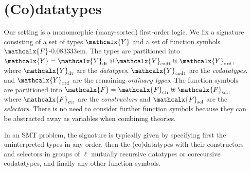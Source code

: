 \documentclass[letter]{article}
\theoremstyle{definition}
\newcommand\Sig{\mathrm{\Sigma}}
\newcommand\ty[1]{\textit{#1}}
\newcommand\Types{\mathcalx{Y}}
\newcommand\Funcs{\mathcalx{F}}
\newcommand\Data{\Types_{\mathrm{dt}}}
\newcommand\Codata{\Types_{\mathrm{codt}}}
\newcommand\Nondata{\Types_{\mathrm{ord}}}
\newcommand\Ctr{\Funcs_{\smash{\mathrm{ctr}}}}
\newcommand\Sel{\Funcs_{\smash{\mathrm{sel}}}}
\newcommand\vthinspace{\kern+0.083333em}
\newcommand\negvthinspace{\kern-0.083333em}
\begin{document}
\section{%
(Co)datatypes}
\label{sec:co-datatypes}

Our setting is a monomorphic (many-sorted) first-order logic.
We fix a signature %
consisting of a set of types $\Types$ and a
set of function symbols $\Funcs$\negvthinspace.
The types are partitioned into
$\Types = \Data \mathrel{\uplus} \Codata \mathrel{\uplus} \Nondata$, where $\Data$ are the
\emph{datatypes}, $\Codata$ are the \emph{codatatypes}, and $\Nondata$ are the remaining
\emph{ordinary types}.
The function symbols are
partitioned into $\Funcs = \Ctr \mathrel{\uplus} \Sel$, where $\Ctr$ are the
\emph{constructors} and $\Sel$ are the \emph{selectors}. There is no need to
consider further function symbols because they can be abstracted away as
variables when combining theories.

In an SMT problem, the signature is typically given by specifying first the
uninterpreted %
types in any order, then the (co)datatypes with their constructors
and selectors in groups of $\ell$ mutually recursive datatypes or corecursive
codatatypes, and
finally any other function symbols.


\newcommand\elll{\kern.0515ex \ell\kern.0515ex}
\newcommand\elllx{\kern.0515ex \ell\kern.0515ex}
\end{document}
